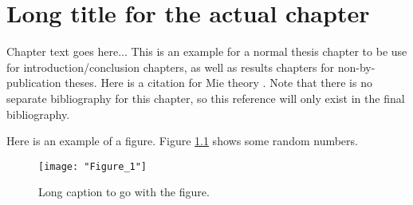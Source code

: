 \documentclass[../main.tex]{subfiles}
\begin{document}
\chapter[Short title for table of contents]{Long title for the actual chapter}
\label{cha:label1}

Chapter text goes here... This is an example for a normal thesis chapter to be use for introduction/conclusion chapters, as well as results chapters for non-by-publication theses. Here is a citation for Mie theory \citep{Mie1908}. Note that there is no separate bibliography for this chapter, so this reference will only exist in the final bibliography.

Here is an example of a figure. Figure \ref{ch1:fig:figure1} shows some random numbers.

\begin{figure}[h]
    \texttt{[image: "Figure\_1"]}

	\caption[Short caption for list of figures]{Long caption to go with the figure.}

	\label{ch1:fig:figure1}
\end{figure}
\end{document}
